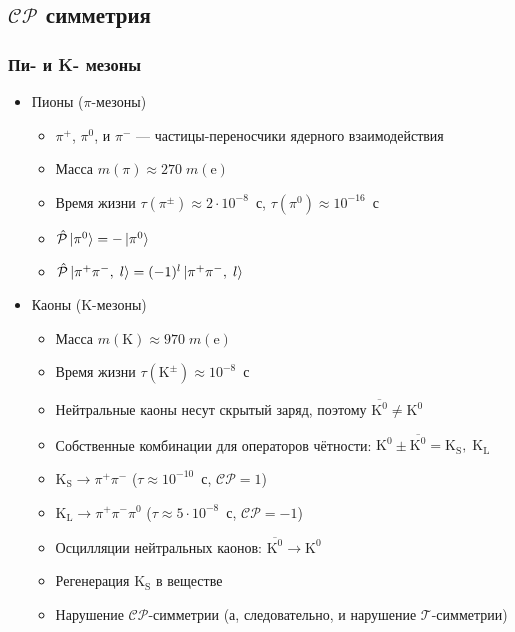\subsection{$\mathcal{CP}$ симметрия}
\begin{frame}
    \frametitle{Пи- и K- мезоны}
    \begin{itemize}[<+->]
    \item Пионы ($\pi$-мезоны)
        \begin{itemize}[<+->]
        \item $\pi^+$, $\pi^0$, и $\pi^-$ --- частицы-переносчики ядерного
        взаимодействия
        \item Масса $m (\pi) \approx 270\; m (\text{e})$
        \item Время жизни $\tau (\pi^\pm) \approx 2 \cdot 10^{-8}$~с,
            $\tau (\pi^0) \approx 10^{-16}$~с
        \item $\hat{\mathcal{P}} \ket{\pi^0} = - \ket{\pi^0}$
        \item $\hat{\mathcal{P}} \ket{\pi^+\pi^-,\;l} = (-1)^l
            \ket{\pi^+ \pi^-,\;l}$
        \end{itemize}
    \item Каоны (K-мезоны)
        \begin{itemize}[<+->]
        \item Масса $m (\text{K}) \approx 970\; m (\text{e})$
        \item Время жизни $\tau (\text{K}^\pm) \approx 10^{-8}$~с
        \item Нейтральные каоны несут скрытый заряд, поэтому
            $\overline{\text{K}^0} \ne \text {K}^0$
        \item Собственные комбинации для операторов чётности:
            $\text{K}^0 \pm \overline{\text{K}^0} =
            \text{K}_\text{S},\;\text{K}_\text{L}$
        \item
            $\text{K}_\text{S}\to\pi^+\pi^-$ ($\tau \approx 10^{-10}$~с,
            $\mathcal{CP} = 1$)
        \item
            $\text{K}_\text{L}\to\pi^+\pi^-\pi^0$ ($\tau \approx 5\cdot10^{-8}$~с,
            $\mathcal{CP} = -1$)
        \item
            Осцилляции нейтральных каонов: $\overline{\text{K}^0} \to \text{K}^0$
        \item
            Регенерация $\text{K}_\text{S}$ в веществе
        \item
            Нарушение $\mathcal{CP}$-симметрии (а, следовательно, и нарушение
            $\mathcal{T}$-симметрии)
        \end{itemize}
    \end{itemize}
\end{frame}
